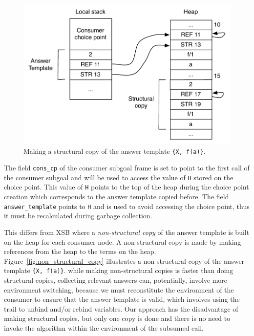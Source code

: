 \begin{figure}[H]
  \centering
    \includegraphics[scale=0.6]{structural_copy.pdf}
  \caption{Making a structural copy of the answer template \texttt{\{X,~f(a)\}}.}
  \label{fig:structural_copy}
\end{figure}

The field \texttt{cons\_cp} of the consumer subgoal frame is set to point to the first call
of the consumer subgoal and will be used to access the value of \texttt{H} stored on the choice point.
This value of \texttt{H} points to the top of the heap during the choice point creation which corresponds
to the answer template copied before. The field \texttt{answer\_template} points to \texttt{H}
and is used to avoid accessing the choice point, thus it must be recalculated during garbage collection.

This differs from XSB \cite{Johnson-00} where a \textit{non-structural copy} of the answer template
is built on the heap for each consumer node. A non-structural copy is made by making references from
the heap to the terms on the heap. Figure~\ref{fig:non_structural_copy} illustrates a non-structural
copy of the answer template \texttt{\{X,~f(a)\}}. 
while making non-structural copies is faster than doing structural copies, collecting relevant answers
can, potentially, involve more environment switching, because we must reconstitute the environment of
the consumer to ensure that the answer template is valid, which involves using the trail to unbind
and/or rebind variables. Our approach has the disadvantage of making structural copies, but only one
copy is done and there is no need to invoke the algorithm within the environment of the subsumed call.

